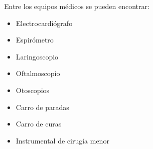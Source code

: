 Entre los equipos médicos se pueden encontrar:

\begin{itemize}
    \item Electrocardiógrafo
    \item Espirómetro
    \item Laringoscopio
    \item Oftalmoscopio
    \item Otoscopios
    \item Carro de paradas
    \item Carro de curas
    \item Instrumental de cirugía menor
\end{itemize}

